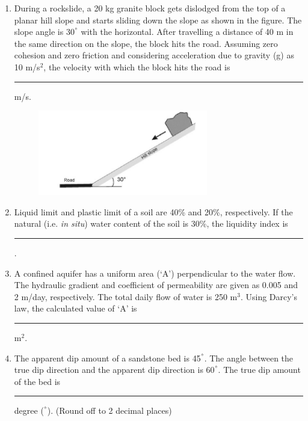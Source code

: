 \documentclass[journal,12pt,onecolumn]{IEEEtran}
\begin{document}
\begin{enumerate}
\hfill{}

\item During a rockslide, a 20 kg granite block gets dislodged from the top of a planar hill slope and starts sliding down the slope as shown in the figure. The slope angle is 30$^{\degree}$ with the horizontal. After travelling a distance of 40 m in the same direction on the slope, the block hits the road. Assuming zero cohesion and zero friction and considering acceleration due to gravity (g) as 10 m/s$^2$, the velocity with which the block hits the road is \rule{1cm}{0.15mm} m/s.

\hfill{}
\begin{figure}[h!]
    \centering
    \includegraphics[width=0.7\textwidth]{figs/fig12.png}
    \caption{}
    \label{fig:partB_geo_q27}
\end{figure}

\item Liquid limit and plastic limit of a soil are 40\% and 20\%, respectively. If the natural (i.e. \textit{in situ}) water content of the soil is 30\%, the liquidity index is \rule{1cm}{0.15mm}.

\hfill{}

\item A confined aquifer has a uniform area (`A') perpendicular to the water flow. The hydraulic gradient and coefficient of permeability are given as 0.005 and 2 m/day, respectively. The total daily flow of water is 250 m$^3$. Using Darcy's law, the calculated value of `A' is \rule{1cm}{0.15mm} m$^2$.

\hfill{}

\item The apparent dip amount of a sandstone bed is 45$^{\degree}$. The angle between the true dip direction and the apparent dip direction is 60$^{\degree}$. The true dip amount of the bed is \rule{1cm}{0.15mm} degree ($^{\degree}$). (Round off to 2 decimal places)

\hfill{}










\end{enumerate}
\end{document}
